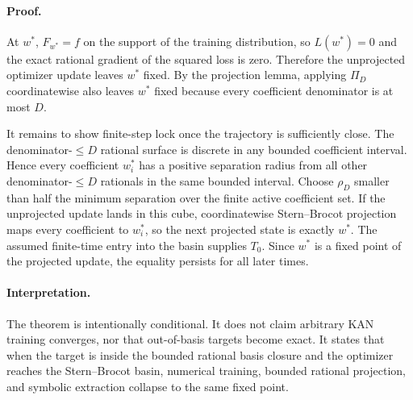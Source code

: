 \paragraph{Proof.}
At \(w^\ast\), \(F_{w^\ast}=f\) on the support of the training distribution,
so \(L(w^\ast)=0\) and the exact rational gradient of the squared loss is
zero.  Therefore the unprojected optimizer update leaves \(w^\ast\) fixed.
By the projection lemma, applying \(\Pi_D\) coordinatewise also leaves
\(w^\ast\) fixed because every coefficient denominator is at most \(D\).

It remains to show finite-step lock once the trajectory is sufficiently close.
The denominator-\(\le D\) rational surface is discrete in any bounded
coefficient interval.  Hence every coefficient \(w_i^\ast\) has a positive
separation radius from all other denominator-\(\le D\) rationals in the same
bounded interval.  Choose \(\rho_D\) smaller than half the minimum separation
over the finite active coefficient set.  If the unprojected update lands in
this cube, coordinatewise Stern--Brocot projection maps every coefficient to
\(w_i^\ast\), so the next projected state is exactly \(w^\ast\).  The
assumed finite-time entry into the basin supplies \(T_0\).  Since \(w^\ast\)
is a fixed point of the projected update, the equality persists for all
later times.

\paragraph{Interpretation.}
The theorem is intentionally conditional.  It does not claim arbitrary KAN
training converges, nor that out-of-basis targets become exact.  It states
that when the target is inside the bounded rational basis closure and the
optimizer reaches the Stern--Brocot basin, numerical training, bounded
rational projection, and symbolic extraction collapse to the same fixed point.

